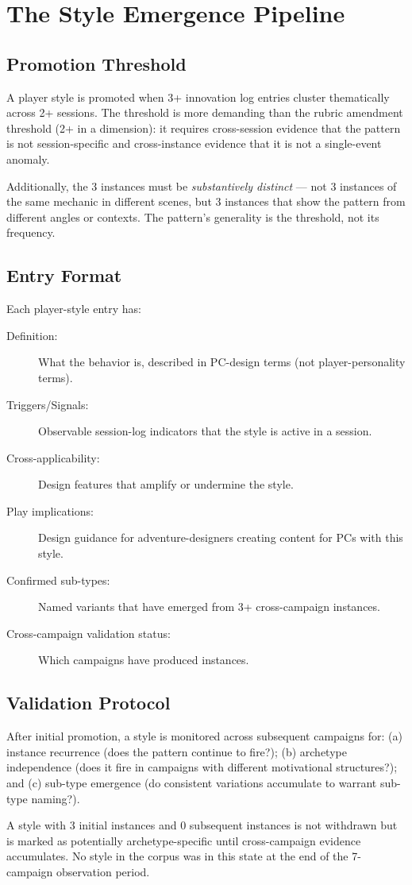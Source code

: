 
\section{The Style Emergence Pipeline}
\label{sec:pipeline}

\subsection{Promotion Threshold}

A player style is promoted when 3+ innovation log entries cluster thematically across
2+ sessions. The threshold is more demanding than the rubric amendment threshold
(2+ in a dimension): it requires cross-session evidence that the pattern is not
session-specific and cross-instance evidence that it is not a single-event anomaly.

Additionally, the 3 instances must be \textit{substantively distinct} --- not 3
instances of the same mechanic in different scenes, but 3 instances that show the
pattern from different angles or contexts. The pattern's generality is the threshold,
not its frequency.

\subsection{Entry Format}

Each player-style entry has:
\begin{description}
  \item[Definition:] What the behavior is, described in PC-design terms (not player-personality terms).
  \item[Triggers/Signals:] Observable session-log indicators that the style is active in a session.
  \item[Cross-applicability:] Design features that amplify or undermine the style.
  \item[Play implications:] Design guidance for adventure-designers creating content for PCs with this style.
  \item[Confirmed sub-types:] Named variants that have emerged from 3+ cross-campaign instances.
  \item[Cross-campaign validation status:] Which campaigns have produced instances.
\end{description}

\subsection{Validation Protocol}

After initial promotion, a style is monitored across subsequent campaigns for:
(a) instance recurrence (does the pattern continue to fire?); (b) archetype independence
(does it fire in campaigns with different motivational structures?); and (c) sub-type
emergence (do consistent variations accumulate to warrant sub-type naming?).

A style with 3 initial instances and 0 subsequent instances is not withdrawn but is
marked as potentially archetype-specific until cross-campaign evidence accumulates.
No style in the corpus was in this state at the end of the 7-campaign observation period.
